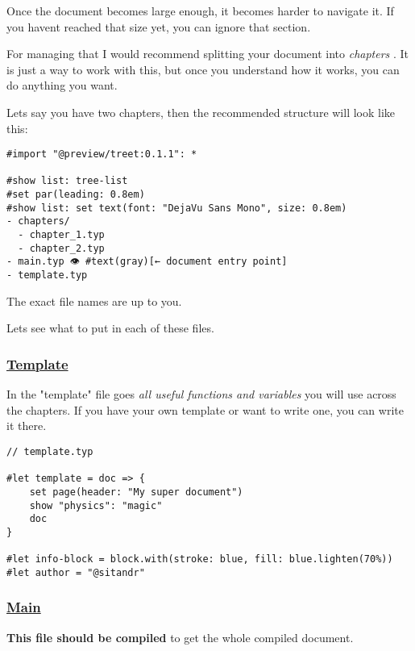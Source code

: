 Once the document becomes large enough, it becomes harder to navigate
it. If you haven\textquotesingle t reached that size yet, you can ignore
that section.

For managing that I would recommend splitting your document into
\emph{chapters} . It is just a way to work with this, but once you
understand how it works, you can do anything you want.

Let\textquotesingle s say you have two chapters, then the recommended
structure will look like this:

\begin{verbatim}
#import "@preview/treet:0.1.1": *

#show list: tree-list
#set par(leading: 0.8em)
#show list: set text(font: "DejaVu Sans Mono", size: 0.8em)
- chapters/
  - chapter_1.typ
  - chapter_2.typ
- main.typ 👁 #text(gray)[← document entry point]
- template.typ
\end{verbatim}

\pandocbounded{}

The exact file names are up to you.

Let\textquotesingle s see what to put in each of these files.

\subsubsection{\texorpdfstring{\hyperref[template]{Template}}{Template}}\label{template}

In the "template" file goes \emph{all useful functions and variables}
you will use across the chapters. If you have your own template or want
to write one, you can write it there.

\begin{verbatim}
// template.typ

#let template = doc => {
    set page(header: "My super document")
    show "physics": "magic"
    doc
}

#let info-block = block.with(stroke: blue, fill: blue.lighten(70%))
#let author = "@sitandr"
\end{verbatim}

\subsubsection{\texorpdfstring{\hyperref[main]{Main}}{Main}}\label{main}

\textbf{This file should be compiled} to get the whole compiled
document.

